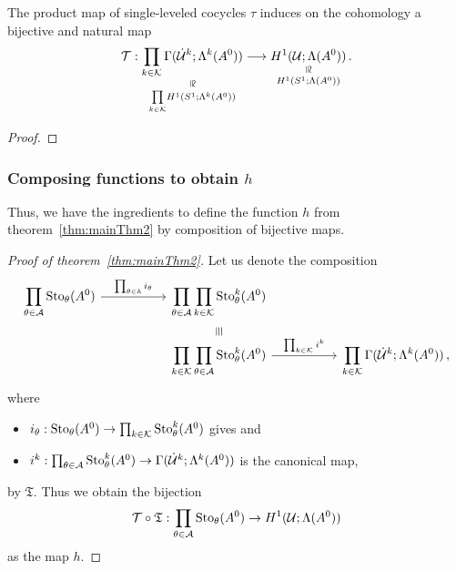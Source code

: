 \begin{cor}
  The product map of single-leveled cocycles $\tau$ induces on the cohomology
  a bijective and natural map
  \[
    \cT:
    \underset{\underset{k\in\cK}\prod H^1(S^1;\Lambda^k(A^0))}{%
      \underset{\text{\rotatebox[origin=c]{-90}{$\cong$}}}{%
        \prod_{k\in\cK}\Gamma(\dot\cU^k;\Lambda^k(A^0))}}
    \longrightarrow
    \underset{H^1(S^1;\Lambda(A^0))}{%
      \underset{\text{\rotatebox[origin=c]{-90}{$\cong$}}}{%
        H^1(\cU;\Lambda(A^0))}}\,.
  \]
\end{cor}
\begin{proof}
  \TODO{}
\end{proof}
\subsubsection{Composing functions to obtain $h$}
Thus, we have the ingredients to define the function $h$ from
theorem~\ref{thm:mainThm2} by composition of bijective maps.
\begin{proof}[Proof of theorem~\ref{thm:mainThm2}]
  Let us denote the composition
  \[ \begin{tikzcd}[column sep=1.8cm,row sep=0]
      \displaystyle \prod_{\theta\in\cA}\Sto_\theta(A^0)
      \rar{\prod_{\theta\in\A}i_\theta} &
      \displaystyle \prod_{\theta\in\cA}\prod_{k\in\cK}\Sto_\theta^k(A^0)
    \\&\text{\rotatebox[origin=c]{-90}{$\equiv$}}
    \\&\displaystyle \prod_{k\in\cK}\prod_{\theta\in\cA}\Sto_\theta^k(A^0)
      \rar{\prod_{k\in\cK}i^k}&
      \displaystyle \prod_{k\in\cK}\Gamma(\dot\cU^k;\Lambda^k(A^0))
      \,,
  \end{tikzcd} \]
  where
  \begin{itemize}
    \item $i_\theta:\operatorname{Sto}_\theta(A^0)\to\prod_{k\in\mathcal{K}}\operatorname{Sto}_\theta^k(A^0)$ gives
      \TODO{} and
    \item $i^k:\prod_{\theta\in\mathcal{A}}\operatorname{Sto}_\theta^k(A^0)
      \to\Gamma(\dot{\mathcal{U}}^k;\Lambda^k(A^0))$ is the canonical map,
  \end{itemize}
  by $\mathfrak{T}$.
  Thus we obtain the bijection
  \[
    \mathcal{T}\circ\mathfrak{T}:
    \prod_{\theta\in\mathcal{A}}\operatorname{Sto}_\theta(A^0)
    \to
    H^1(\mathcal{U};\Lambda(A^0))
  \]
  as the map $h$.
\end{proof}

